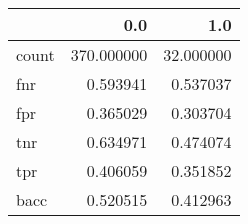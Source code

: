 \begin{tabular}{lrr}
\toprule
{} &         0.0 &        1.0 \\
\midrule
count &  370.000000 &  32.000000 \\
fnr   &    0.593941 &   0.537037 \\
fpr   &    0.365029 &   0.303704 \\
tnr   &    0.634971 &   0.474074 \\
tpr   &    0.406059 &   0.351852 \\
bacc  &    0.520515 &   0.412963 \\
\bottomrule
\end{tabular}
